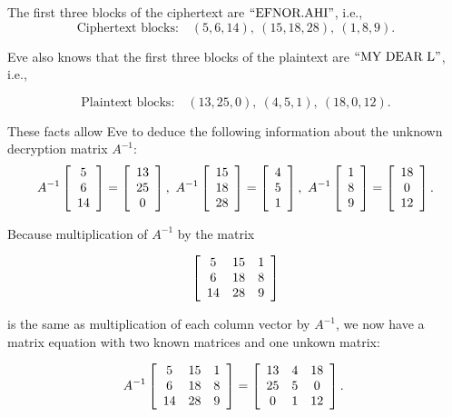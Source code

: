 \documentclass{ximera}
\begin{document}
\begin{solution}
  The first three blocks of the ciphertext are $\q{EFNOR.AHI}$, i.e.,
  \begin{equation*}
    \mbox{Ciphertext blocks:}\quad
    (5,6,14),\
    (15,18,28),\
    (1,8,9).
  \end{equation*}

  Eve also knows that the first three blocks of the plaintext are
  $\q{MY DEAR L}$, i.e.,

  \begin{equation*}
    \mbox{Plaintext blocks:}\quad
    (13,25,0),\
    (4,5,1),\
    (18,0,12).
  \end{equation*}

  These facts allow Eve to deduce the following information about the
  unknown decryption matrix $A^{-1}$:
  \begin{equation*}
    A^{-1} \startmat{c} 5 \\ 6 \\ 14 \stopmat
    = \startmat{c} 13 \\ 25 \\ 0 \stopmat,\quad
    A^{-1} \startmat{c} 15 \\ 18 \\ 28 \stopmat
    = \startmat{c} 4 \\ 5 \\ 1 \stopmat,\quad
    A^{-1} \startmat{c} 1 \\ 8 \\ 9 \stopmat
    = \startmat{c} 18 \\ 0 \\ 12 \stopmat.
  \end{equation*}

  Because multiplication of $A^{-1}$ by the matrix 
  
  \begin{equation*}
    \startmat{ccc}
      5 & 15 & 1 \\
      6 & 18 & 8 \\
      14 & 28 & 9 \\
    \stopmat
  \end{equation*}

  is the same as multiplication of each column vector by $A^{-1}$, we now have a matrix equation with two known matrices and one unkown matrix:
  
  \begin{equation*}
    A^{-1} \startmat{ccc}
      5 & 15 & 1 \\
      6 & 18 & 8 \\
      14 & 28 & 9 \\
    \stopmat
    = \startmat{ccc}
      13 & 4 & 18 \\
      25 & 5 & 0 \\
      0 & 1 & 12 \\
    \stopmat.\quad
  \end{equation*}


\end{solution}
\end{document}

